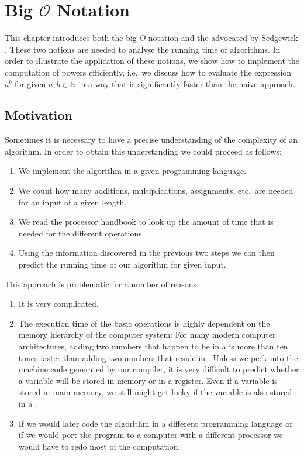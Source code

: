 \chapter{Big $\mathcal{O}$ Notation} 
This chapter introduces both the
\href{http://en.wikipedia.org/wiki/O_notation}{big $O$ notation} and the
 advocated by Sedgewick \cite{sedgewick:11}.
These two notions are needed to analyse the running time of algorithms.  In order to illustrate
the application of these notions, we show how to implement the computation of powers efficiently,
i.e.~we discuss how to evaluate the expression $a^b$ for given $a,b \in \mathbb{N}$ in a way that
is significantly faster than the naive approach. 

\section{Motivation}
Sometimes it is necessary to have a precise understanding of the complexity of an algorithm.  
In order to obtain this understanding we could proceed as follows:  
\begin{enumerate}
\item We implement the algorithm in a given programming language.
\item We count how many additions, multiplications, assignments, etc.~are needed
      for an input of a given length.
\item We read the processor handbook to look up the amount of time that is needed for the different operations.
\item Using the information discovered in the previous two steps we can then predict the running
      time of our algorithm for given input.
\end{enumerate}
This approach is problematic for a number of reasons.
\begin{enumerate}
\item It is very complicated.
\item The execution time of the basic operations is highly dependent on the memory hierarchy of the
      computer system:  For many modern computer architectures, adding two numbers that happen to be
      in a  is more than ten times faster than adding two numbers that reside in
      .  Unless we peek into the machine code generated by our compiler, it is very difficult
      to predict whether a variable will be stored in memory or in a register.  Even if a variable
      is stored in main memory, we still might get lucky if the variable is also stored in a .
\item If we would later code the algorithm in a different programming language or if we would port
      the program to a computer with a different processor we would have to redo most of the
      computation. 
\end{enumerate}
